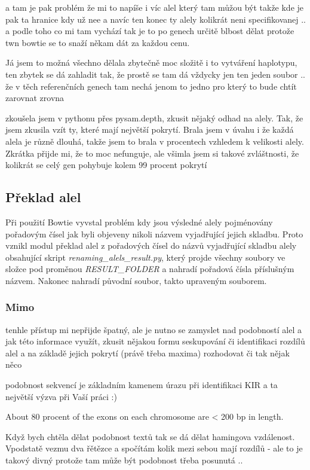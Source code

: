 \documentclass[czech,DP]{thesiskiv}
\numberwithin{equation}{section}
\begin{document}
a tam je pak problém že mi to napíše i víc alel který tam můžou být takže kde je pak ta hranice kdy už nee
a navíc ten konec ty alely kolikrát neni specifikovanej ..
a podle toho co mi tam vychází tak je to po genech určitě blbost dělat protože twn bowtie se to snaží někam dát za každou cenu.

Já jsem to možná všechno dělala zbytečně moc složitě i to vytváření haplotypu, ten zbytek se dá zahladit tak, že prostě se tam dá vždycky jen ten jeden soubor .. že v těch referenčních genech tam nechá jenom to jedno pro který to bude chtít zarovnat zrovna 

zkoušela jsem v pythonu přes pysam.depth, zkusit nějaký odhad na alely. Tak, že jsem zkusila vzít ty, které mají největší pokrytí. Brala jsem v úvahu i že každá alela je různě dlouhá, takže jsem to brala v procentech vzhledem k velikosti alely.  Zkrátka přijde mi, že to moc nefunguje, ale všimla jsem si takové zvláštnosti, že kolikrát se celý gen pohybuje kolem 99 procent pokrytí

\subsection{Překlad alel}
Při použití Bowtie vyvstal problém kdy jsou výsledné alely pojménovány pořadovým čísel jak byli objeveny nikoli názvem vyjadřující jejich skladbu. Proto vznikl modul překlad alel z pořadových čísel do názvů vyjadřující skladbu alely obsahující skript \textit{renaming\_alels\_result.py}, který projde všechny soubory ve složce pod proměnou \textit{RESULT\_FOLDER} a nahradí pořadová čísla příslušným názvem. Nakonec nahradí původní soubor, takto upraveným souborem.

\subsubsection{Mimo}
tenhle přístup mi nepřijde špatný, ale je nutno se zamyslet nad podobností alel a jak této informace využít, zkusit nějakou formu seskupování či identifikaci rozdílů alel a na základě jejich pokrytí (právě třeba maxima) rozhodovat či tak nějak něco


podobnost sekvencí je základním kamenem úrazu při identifikaci KIR a ta největší výzva při Vaší práci :)

About 80 procent of the exons on each chromosome are < 200 bp in length.

Když bych chtěla dělat podobnost textů tak se dá dělat hamingova vzdálenost. Vpodstatě vezmu dva řětězce a spočítám kolik mezi sebou mají rozdílů
- ale to je takový divný protože tam může být podobnost třeba posunutá ..
\end{document}
